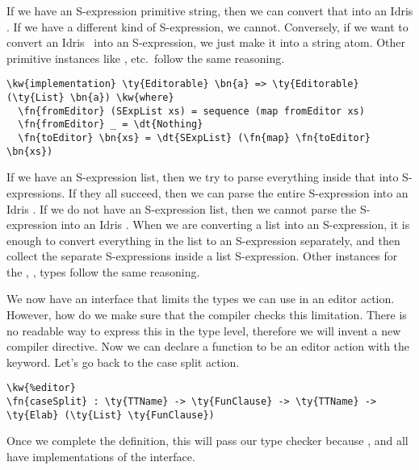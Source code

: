If we have an S-expression primitive string, then we can convert that into
an Idris \String. If we have a different kind of S-expression, we cannot.
Conversely, if we want to convert an Idris \String\ into an S-expression, we
just make it into a string atom. Other primitive instances like ,
 etc.\ follow the same reasoning.

\begin{Verbatim}[framesep=2mm, label=\footnotesize{\normalfont{Idris}}, labelposition=topline]
\kw{implementation} \ty{Editorable} \bn{a} => \ty{Editorable} (\ty{List} \bn{a}) \kw{where}
  \fn{fromEditor} (SExpList xs) = sequence (map fromEditor xs)
  \fn{fromEditor} _ = \dt{Nothing}
  \fn{toEditor} \bn{xs} = \dt{SExpList} (\fn{map} \fn{toEditor} \bn{xs})
\end{Verbatim}

If we have an S-expression list, then we try to parse everything inside that
into S-expressions. If they all succeed, then we can parse the entire
S-expression into an Idris . If we do not have an S-expression list,
then we cannot parse the S-expression into an Idris .  When we are
converting a list into an S-expression, it is enough to convert everything in
the list to an S-expression separately, and then collect the separate
S-expressions inside a list S-expression. Other instances for the ,
,  types follow the same reasoning.

We now have an interface that limits the types we can use in an editor action.
However, how do we make sure that the compiler checks this limitation.
There is no readable way to express this in the type level, therefore we will
invent a new compiler directive. Now we can declare a function to be an editor
action with the \texttt{} keyword. Let's go back to the
case split action.


\begin{Verbatim}[framesep=2mm, label=\footnotesize{\normalfont{Idris}}, labelposition=topline]
\kw{%editor}
\fn{caseSplit} : \ty{TTName} -> \ty{FunClause} -> \ty{TTName} -> \ty{Elab} (\ty{List} \ty{FunClause})
\end{Verbatim}

Once we complete the definition, this will pass our type checker because
,  and  all have implementations of
the  interface.


